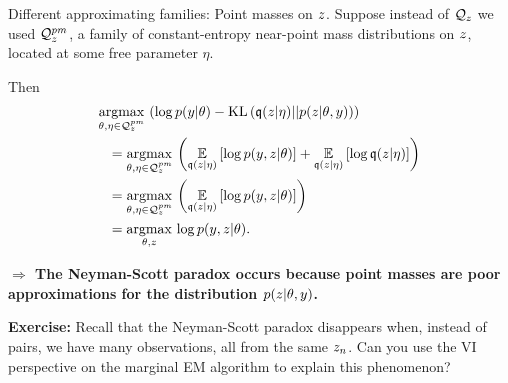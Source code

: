 \begin{frame}{Different approximating families: Point masses on $z$.}
%
Suppose instead of $\mathcal{Q}_z$ we used $\mathcal{Q}_{z}^{pm}$, a family of
constant-entropy near-point mass distributions on $z$, located at
some free parameter $\eta$.

\pause

Then
%
\begin{align*}
%
\MoveEqLeft
\argmax{\theta, \eta \in \qdom_{\z}^{pm}}
\left(
\log p(\y | \theta) -
    \kl{\q(\z | \eta)}{p(\z | \theta, \y)}  \right)
\\={}&
\argmax{\theta, \eta \in \qdom_{\z}^{pm}}
\left(
\expect{\q(\z | \eta)}{
    \log p(\y, \z | \theta) }
+ \expect{\q(\z | \eta)}{\log \q(\z | \eta)
}\right)
\\={}&
\argmax{\theta, \eta \in \qdom_{\z}^{pm}}
\left(
\expect{\q(\z | \eta)}{
    \log p(\y, \z | \theta) }
\right)
\\={}&
\argmax{\theta, \z}
    \log p(\y, \z | \theta).
%
\end{align*}
%
\pause

\textbf{
$\Rightarrow$ The Neyman-Scott paradox occurs because point masses are
poor approximations for the distribution $p(z | \theta, y)$.
}

\pause

\textbf{Exercise: }  Recall that the Neyman-Scott paradox disappears when,
instead of pairs, we have many observations, all from the same $z_n$.
Can you use the VI perspective on the marginal EM algorithm to explain
this phenomenon?


\end{frame}


